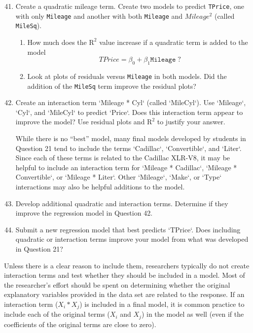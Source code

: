 \documentclass[
]{book}
\begin{document}
\begin{enumerate}
  \setcounter{enumi}{40}

  \item Create a quadratic mileage term. Create two models to predict \texttt{TPrice}, one with only \texttt{Mileage} and another with both \texttt{Mileage} and $Mileage^2$ (called \texttt{MileSq}).

  \begin{enumerate}
    \item How much does the $\mathrm{R}^2$ value increase if a quadratic term is added to the model
    \[
      TPrice = \beta_0 + \beta_1 \texttt{Mileage} \; ?
    \]
    
    \item Look at plots of residuals versus \texttt{Mileage} in both models. Did the addition of the \texttt{MileSq} term improve the residual plots?
  \end{enumerate}

  \item Create an interaction term `Mileage * Cyl` (called `MileCyl`). Use `Mileage`, `Cyl`, and `MileCyl` to predict `Price`. Does this interaction term appear to improve the model? Use residual plots and $\mathrm{R}^2$ to justify your answer.

  While there is no “best” model, many final models developed by students in Question 21 tend to include the terms `Cadillac`, `Convertible`, and `Liter`. Since each of these terms is related to the Cadillac XLR-V8, it may be helpful to include an interaction term for `Mileage * Cadillac`, `Mileage * Convertible`, or `Mileage * Liter`. Other `Mileage`, `Make`, or `Type` interactions may also be helpful additions to the model.

  \item Develop additional quadratic and interaction terms. Determine if they improve the regression model in Question 42.

  \item Submit a new regression model that best predicts `TPrice`. Does including quadratic or interaction terms improve your model from what was developed in Question 21?
\end{enumerate}

Unless there is a clear reason to include them, researchers typically do not create interaction terms and test whether they should be included in a model. Most of the researcher's effort should be spent on determining whether the original explanatory variables provided in the data set are related to the response. If an interaction term (\(X_i * X_j\)) is included in a final model, it is common practice to include each of the original terms (\(X_i\) and \(X_j\)) in the model as well (even if the coefficients of the original terms are close to zero).
\end{document}
